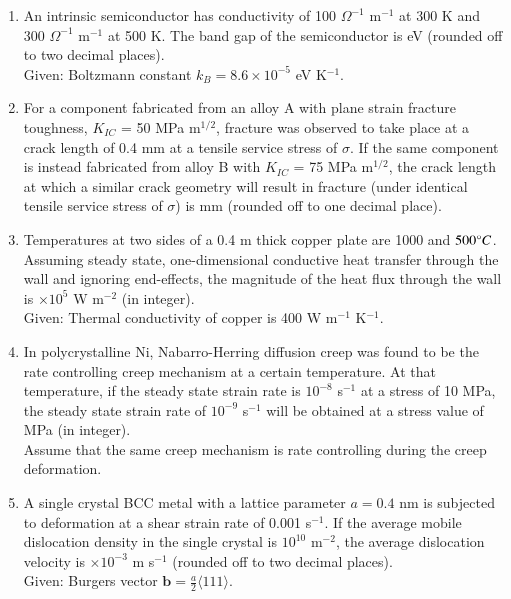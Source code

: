 \documentclass[journal]{IEEEtran}
\theoremstyle{remark}
\begin{document}
\begin{enumerate}[resume]
\item An intrinsic semiconductor has conductivity of 100 $\Omega^{-1}$ m$^{-1}$ at 300 K and 300 $\Omega^{-1}$ m$^{-1}$ at 500 K. The band gap of the semiconductor is \underline{\hspace{2cm}} eV (rounded off to two decimal places). \hfill{} \\
Given: Boltzmann constant $k_B = 8.6 \times 10^{-5}$ eV K$^{-1}$.

\item For a component fabricated from an alloy A with plane strain fracture toughness, $K_{IC}$ = 50 MPa m$^{1/2}$, fracture was observed to take place at a crack length of 0.4 mm at a tensile service stress of $\sigma$. If the same component is instead fabricated from alloy B with $K_{IC}$ = 75 MPa m$^{1/2}$, the crack length at which a similar crack geometry will result in fracture (under identical tensile service stress of $\sigma$) is \underline{\hspace{2cm}} mm (rounded off to one decimal place). \hfill{}

\item Temperatures at two sides of a 0.4 m thick copper plate are 1000 and $500 \degree C$. Assuming steady state, one-dimensional conductive heat transfer through the wall and ignoring end-effects, the magnitude of the heat flux through the wall is \underline{\hspace{2cm}} $\times 10^5$ W m$^{-2}$ (in integer). \hfill{} \\
Given: Thermal conductivity of copper is 400 W m$^{-1}$ K$^{-1}$.

\item In polycrystalline Ni, Nabarro-Herring diffusion creep was found to be the rate controlling creep mechanism at a certain temperature. At that temperature, if the steady state strain rate is $10^{-8}$ s$^{-1}$ at a stress of 10 MPa, the steady state strain rate of $10^{-9}$ s$^{-1}$ will be obtained at a stress value of \underline{\hspace{2cm}} MPa (in integer). \hfill{} \\
Assume that the same creep mechanism is rate controlling during the creep deformation.

\item A single crystal BCC metal with a lattice parameter $a = 0.4$ nm is subjected to deformation at a shear strain rate of 0.001 s$^{-1}$. If the average mobile dislocation density in the single crystal is $10^{10}$ m$^{-2}$, the average dislocation velocity is \underline{\hspace{2cm}} $\times 10^{-3}$ m s$^{-1}$ (rounded off to two decimal places). \hfill{} \\
Given: Burgers vector $\mathbf{b} = \frac{a}{2}\langle111\rangle$.


\end{enumerate}
\end{document}
